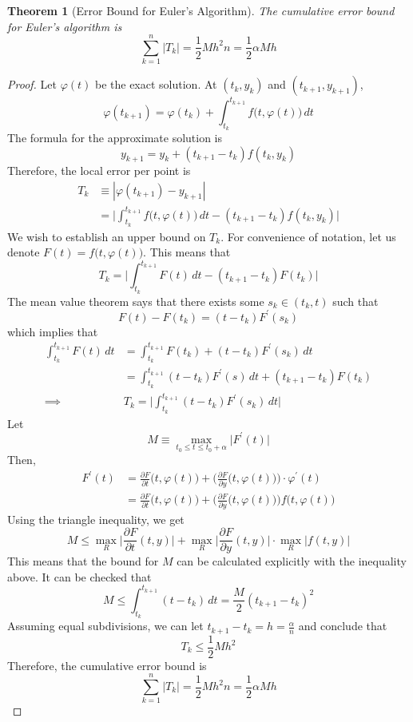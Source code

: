 \documentclass{article}
\newtheorem{theorem}{Theorem}[section]
\theoremstyle{remark}
\theoremstyle{definition}
\begin{document}
\begin{theorem}[Error Bound for Euler's Algorithm]
The cumulative error bound for Euler's algorithm is
\[\sum_{k=1}^n |T_k| = \frac{1}{2} M h^2 n = \frac{1}{2} \alpha M h\]
\end{theorem}
\begin{proof}
Let $\varphi(t)$ be the exact solution. At $(t_k, y_k)$ and $(t_{k+1}, y_{k+1})$, 
\[\varphi(t_{k+1}) = \varphi(t_k) + \int_{t_k}^{t_{k+1}} f\big(t, \varphi(t)\big) \, dt\]
The formula for the approximate solution is
\[y_{k+1} = y_k + (t_{k+1} - t_k) f(t_k, y_k)\]
Therefore, the local error per point is 
\begin{align*}
    T_k & \equiv |\varphi(t_{k+1}) - y_{k+1}| \\
    & = \bigg| \int_{t_k}^{t_{k+1}} f\big(t, \varphi(t)\big)\, dt - (t_{k+1} - t_k) f(t_k, y_k) \bigg| 
\end{align*}
We wish to establish an upper bound on $T_k$. For convenience of notation, let us denote $F(t) = f\big(t, \varphi(t)\big)$. This means that 
\[T_k = \bigg| \int_{t_k}^{t_{k+1}} F(t)\,dt - (t_{k+1} - t_k ) F(t_k) \bigg| \]
The mean value theorem says that there exists some $s_k \in (t_k, t)$ such that 
\[F(t) - F(t_k) = (t - t_k) F^\prime (s_k)\]
which implies that
\begin{align*}
    \int_{t_k}^{t_{k+1}} F(t)\, dt & = \int_{t_k}^{t_{k+1}} F(t_k) + (t - t_k) F^\prime (s_k)\,dt \\
    & = \int_{t_k}^{t_{k+1}} (t - t_k) F^\prime (s) \, dt + (t_{k+1} - t_k) F (t_k) \\
    \implies & T_k = \bigg| \int_{t_k}^{t_{k+1}}  (t - t_k) F^\prime (s_k)\, dt \bigg|
\end{align*}
Let 
\[M \equiv \max_{t_0 \leq t \leq t_0 + \alpha} \big| F^\prime (t) \big|\]
Then, 
\begin{align*}
    F^\prime (t) & = \frac{\partial F}{\partial t} \big(t, \varphi(t)\big) + \bigg( \frac{\partial F}{\partial y} \big(t, \varphi(t)\big) \bigg) \cdot \varphi^\prime (t) \\
    & = \frac{\partial F}{\partial t} \big(t, \varphi (t)\big) + \bigg(\frac{\partial F}{\partial y} \big(t, \varphi(t)\big) \bigg) f \big(t, \varphi(t)\big)
\end{align*}
Using the triangle inequality, we get
\[M \leq \max_R \Big| \frac{\partial F}{\partial t} (t, y)\Big| + \max_R \Big| \frac{\partial F}{\partial y} (t, y)\Big| \cdot \max_R \Big| f(t, y) \Big|\]
This means that the bound for $M$ can be calculated explicitly with the inequality above. It can be checked that
\[M \leq \int_{t_k}^{t_{k+1}} (t - t_k) \, dt = \frac{M}{2}(t_{k+1} - t_k)^2 \]
Assuming equal subdivisions, we can let $t_{k+1} - t_k = h = \frac{\alpha}{n}$ and conclude that 
\[T_k \leq \frac{1}{2} M h^2\]
Therefore, the cumulative error bound is 
\[\sum_{k=1}^n |T_k| = \frac{1}{2} M h^2 n = \frac{1}{2} \alpha M h\]
\end{proof}
\end{document}
